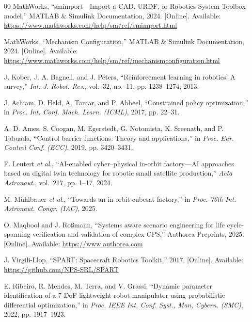 \documentclass{ieeeaccess}
\begin{document}
\begin{thebibliography}{00}
MathWorks, ``smimport---Import a CAD, URDF, or Robotics System Toolbox model,'' MATLAB \& Simulink Documentation, 2024. [Online]. Available: \url{https://www.mathworks.com/help/sm/ref/smimport.html}



MathWorks, ``Mechanism Configuration,'' MATLAB \& Simulink Documentation, 2024. [Online]. Available: \url{https://www.mathworks.com/help/sm/ref/mechanismconfiguration.html}



J. Kober, J. A. Bagnell, and J. Peters, ``Reinforcement learning in robotics: A survey,'' \emph{Int. J. Robot. Res.}, vol.~32, no.~11, pp. 1238--1274, 2013.



J. Achiam, D. Held, A. Tamar, and P. Abbeel, ``Constrained policy optimization,'' in \emph{Proc. Int. Conf. Mach. Learn. (ICML)}, 2017, pp. 22--31.



A. D. Ames, S. Coogan, M. Egerstedt, G. Notomista, K. Sreenath, and P. Tabuada, ``Control barrier functions: Theory and applications,'' in \emph{Proc. Eur. Control Conf. (ECC)}, 2019, pp. 3420--3431.



F. Leutert \emph{et al.}, ``AI-enabled cyber--physical in-orbit factory---AI approaches based on digital twin technology for robotic small satellite production,'' \emph{Acta Astronaut.}, vol.~217, pp. 1--17, 2024.



M. M{\"u}hlbauer \emph{et al.}, ``Towards an in-orbit cubesat factory,'' in \emph{Proc. 76th Int. Astronaut. Congr. (IAC)}, 2025.



O. Maqbool and J. Roßmann, ``Systems aware scenario engineering for life cycle-spanning verification and validation of complex CPS,'' Authorea Preprints, 2025. [Online]. Available: \url{https://www.authorea.com}



J. Virgili-Llop, ``SPART: Spacecraft Robotics Toolkit,'' 2017. [Online]. Available: \url{https://github.com/NPS-SRL/SPART}



E. Ribeiro, R. Mendes, M. Terra, and V. Grassi, ``Dynamic parameter identification of a 7-DoF lightweight robot manipulator using probabilistic differential optimization,'' in \emph{Proc. IEEE Int. Conf. Syst., Man, Cybern. (SMC)}, 2022, pp. 1917--1923.




\end{thebibliography}
\end{document}
